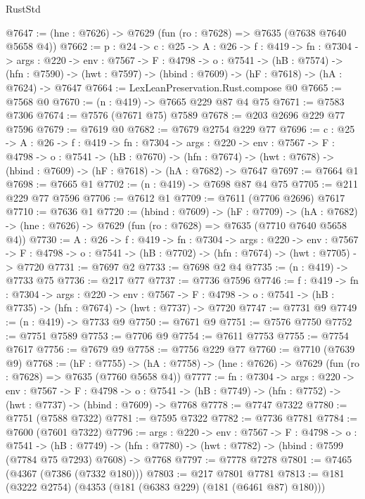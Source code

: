 \begin{lexlean}{RustStd}
\begin{coremodule}
@7647 := (hne : @7626) -> @7629 (fun (ro : @7628) => @7635 (@7638 @7640 @5658 @4))
@7662 := {p : @24} ->
  {c : @25} ->
  {A : @26} ->
  {f : @419} ->
  {fn : @7304} ->
  {args : @220} ->
  {env : @7567} ->
  {F : @4798} ->
  {o : @7541} ->
  (hB : @7574) ->
  (hfn : @7590) -> (hwt : @7597) -> (hbind : @7609) -> (hF : @7618) -> (hA : @7624) -> @7647
@7664 := LexLeanPreservation.Rust.compose @0
@7665 := @7568 @0
@7670 := (n : @419) -> @7665 @229 @87 @4 @75
@7671 := @7583 @7306
@7674 := @7576 (@7671 @75) @7589
@7678 := @203 @2696 @229 @77 @7596
@7679 := @7619 @0
@7682 := @7679 @2754 @229 @77
@7696 := {c : @25} ->
  {A : @26} ->
  {f : @419} ->
  {fn : @7304} ->
  {args : @220} ->
  {env : @7567} ->
  {F : @4798} ->
  {o : @7541} ->
  (hB : @7670) ->
  (hfn : @7674) -> (hwt : @7678) -> (hbind : @7609) -> (hF : @7618) -> (hA : @7682) -> @7647
@7697 := @7664 @1
@7698 := @7665 @1
@7702 := (n : @419) -> @7698 @87 @4 @75
@7705 := @211 @229 @77 @7596
@7706 := @7612 @1
@7709 := @7611 (@7706 @2696) @7617
@7710 := @7636 @1
@7720 := (hbind : @7609) ->
  (hF : @7709) ->
  (hA : @7682) -> (hne : @7626) -> @7629 (fun (ro : @7628) => @7635 (@7710 @7640 @5658 @4))
@7730 := {A : @26} ->
  {f : @419} ->
  {fn : @7304} ->
  {args : @220} ->
  {env : @7567} ->
  {F : @4798} -> {o : @7541} -> (hB : @7702) -> (hfn : @7674) -> (hwt : @7705) -> @7720
@7731 := @7697 @2
@7733 := @7698 @2 @4
@7735 := (n : @419) -> @7733 @75
@7736 := @217 @77
@7737 := @7736 @7596
@7746 := {f : @419} ->
  {fn : @7304} ->
  {args : @220} ->
  {env : @7567} ->
  {F : @4798} -> {o : @7541} -> (hB : @7735) -> (hfn : @7674) -> (hwt : @7737) -> @7720
@7747 := @7731 @9
@7749 := (n : @419) -> @7733 @9
@7750 := @7671 @9
@7751 := @7576 @7750
@7752 := @7751 @7589
@7753 := @7706 @9
@7754 := @7611 @7753
@7755 := @7754 @7617
@7756 := @7679 @9
@7758 := @7756 @229 @77
@7760 := @7710 (@7639 @9)
@7768 := (hF : @7755) ->
  (hA : @7758) -> (hne : @7626) -> @7629 (fun (ro : @7628) => @7635 (@7760 @5658 @4))
@7777 := {fn : @7304} ->
  {args : @220} ->
  {env : @7567} ->
  {F : @4798} ->
  {o : @7541} -> (hB : @7749) -> (hfn : @7752) -> (hwt : @7737) -> (hbind : @7609) -> @7768
@7778 := @7747 @7322
@7780 := @7751 (@7588 @7322)
@7781 := @7595 @7322
@7782 := @7736 @7781
@7784 := @7600 (@7601 @7322)
@7796 := {args : @220} ->
  {env : @7567} ->
  {F : @4798} ->
  {o : @7541} ->
  (hB : @7749) -> (hfn : @7780) -> (hwt : @7782) -> (hbind : @7599 (@7784 @75 @7293) @7608) -> @7768
@7797 := @7778 @7278
@7801 := @7465 (@4367 (@7386 (@7332 @180)))
@7803 := @217 @7801 @7781
@7813 := @181 (@3222 @2754) (@4353 (@181 (@6383 @229) (@181 (@6461 @87) @180)))

\end{coremodule}
\end{lexlean}
